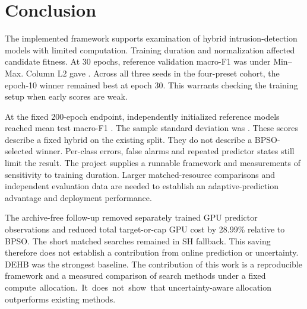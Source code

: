 \section{Conclusion}
The implemented framework supports examination of hybrid intrusion-detection models with limited computation. Training duration and normalization affected candidate fitness. At 30 epochs, reference validation macro-F1 was \ExtMinmaxThirty{} under Min--Max. Column L2 gave \ExtColumnThirty{}. Across all three seeds in the four-preset cohort, the epoch-10 winner remained best at epoch 30. This warrants checking the training setup when early scores are weak.

At the fixed 200-epoch endpoint, independently initialized reference models reached mean test macro-F1 \FinalTestFOne{}. The sample standard deviation was \FinalTestFOneSD{}. These scores describe a fixed hybrid on the existing split. They do not describe a BPSO-selected winner. Per-class errors, false alarms and repeated predictor states still limit the result. The project supplies a runnable framework and measurements of sensitivity to training duration. Larger matched-resource comparisons and independent evaluation data are needed to establish an adaptive-prediction advantage and deployment performance.

The archive-free follow-up removed separately trained GPU predictor observations and reduced total target-or-cap GPU cost by 28.99\% relative to BPSO. The short matched searches remained in SH fallback. This saving therefore does not establish a contribution from online prediction or uncertainty. DEHB was the strongest baseline. The contribution of this work is a reproducible framework and a measured comparison of search methods under a fixed \mbox{compute allocation. It does not show that} uncertainty-aware allocation outperforms existing methods.





